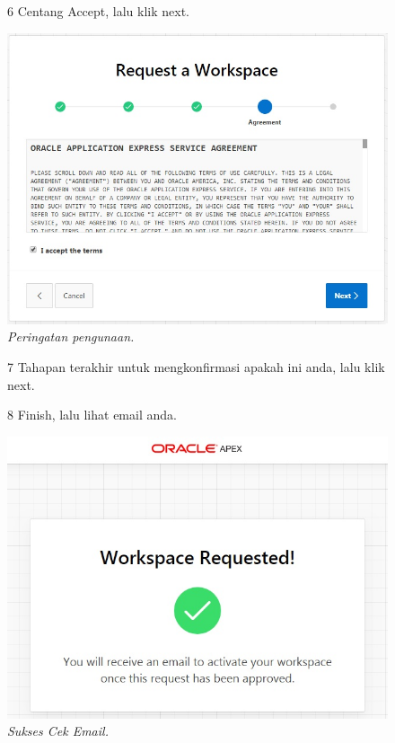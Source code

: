 \begin{enumerate}
\begin{figure}
\label{gambar}
\end{figure}

\begin{figure}
\item[6] Centang Accept, lalu klik next.

    \begin{center}
\includegraphics[scale=0.5]{figures/req4.jpg}
    \caption{\textit{Peringatan pengunaan.}}
        \end{center}

\label{gambar}
\end{figure}

\begin{figure}
\item[7] Tahapan terakhir untuk mengkonfirmasi apakah ini anda, lalu klik next.

    
\label{gambar}
\end{figure}

\begin{figure}
\item[8] Finish, lalu lihat email anda.

    \begin{center}
\includegraphics[scale=0.5]{figures/req6.jpg}
    \caption{\textit{Sukses Cek Email.}}
        \end{center}
\label{gambar}
\end{figure}


\end{enumerate}
